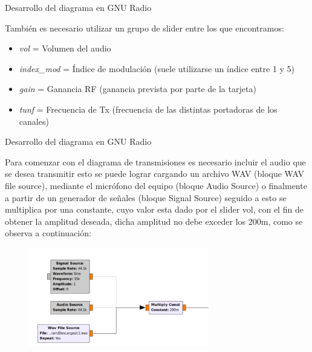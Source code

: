 \begin{frame}{Desarrollo del diagrama en GNU Radio}

También es necesario utilizar un grupo de slider entre los que encontramos:
\begin{itemize}
    \item {\textit{vol}  = Volumen del audio}
    \item {\textit{index\_mod} = Índice de modulación (suele utilizarse un índice entre 1 y 5)}
    \item {\textit{gain} = Ganancia RF (ganancia prevista por parte de la tarjeta)}
    \item {\textit{tunf} = Frecuencia de Tx (frecuencia de las distintas portadoras de los canales)}
    
\end{itemize}{}

\end{frame}

\begin{frame}{Desarrollo del diagrama en GNU Radio}

Para comenzar con el diagrama de transmisiones es necesario incluir el audio que se desea transmitir esto se puede lograr cargando un archivo WAV (bloque WAV file source), mediante el micrófono del equipo (bloque Audio Source) o finalmente a partir de un generador de señales (bloque Signal Source) seguido a esto se multiplica por una constante, cuyo valor esta dado por el slider vol, con el fin de obtener la amplitud deseada, dicha amplitud no debe exceder los 200m, como se observa a continuación:

\begin{figure}[H]
\centering
\vspace{-3mm}
\includegraphics[width=0.7\textwidth]{parte3/lab14/pdf/Lab14_3.pdf}
\end{figure}


\end{frame}

